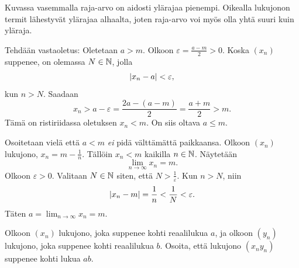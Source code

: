 \documentclass[11pt,a4paper]{amsart}
\begin{document}
\begin{solution}
  Kuvassa vasemmalla raja-arvo on aidosti ylärajaa pienempi. Oikealla
  lukujonon termit lähestyvät ylärajaa alhaalta, joten raja-arvo voi myös olla
  yhtä suuri kuin yläraja.
  \begin{center}
  \end{center}

  Tehdään vastaoletus: Oletetaan \(a > m\). Olkoon \(\varepsilon =
  \frac{a - m}{2} > 0\). Koska \((x_n)\) suppenee, on olemassa \(N \in \mathbb{N}\),
  jolla
  \[
    \lvert x_n - a\rvert < \varepsilon,
  \]
  kun \(n > N\). Saadaan
  \[
    x_n > a - \varepsilon = \frac{2a - (a - m)}{2} = \frac{a + m}{2} > m.
  \]
  Tämä on ristiriidassa oletuksen \(x_n < m\). On siis oltava
  \(a \leq m\).

  Osoitetaan vielä että \(a < m\) \emph{ei} pidä välttämättä paikkaansa.
  Olkoon \((x_n)\) lukujono, \(x_n = m - \frac{1}{n}\). Tällöin
  \(x_n < m\) kaikilla \(n \in \mathbb{N}\). Näytetään
  \[
    \lim_{n \to \infty} x_n = m.
  \]
  Olkoon \(\varepsilon > 0\). Valitaan \(N \in \mathbb{N}\) siten, että
  \(N > \frac{1}{\varepsilon}\). Kun \(n > N\), niin
  \[
    \lvert x_n - m\rvert = \frac{1}{n} < \frac{1}{N} < \varepsilon.
  \]
  Täten \(a = \lim_{n \to \infty} x_n = m\).
\end{solution}

\begin{exercise}
  Olkoon \((x_n)\) lukujono, joka suppenee kohti reaalilukua \(a\), ja
  olkoon \((y_n)\) lukujono, joka suppenee kohti reaalilukua \(b\).
  Osoita, että lukujono \((x_ny_n)\) suppenee kohti lukua \(ab\).
\end{exercise}
\end{document}
